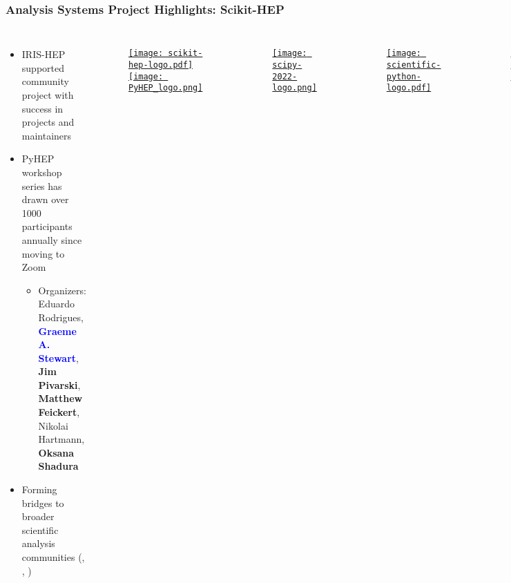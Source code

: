 \begin{frame}
  \frametitle{Analysis Systems Project Highlights: Scikit-HEP}

  \begin{columns}
    \begin{itemize}
      \item IRIS-HEP supported community project with success in projects and maintainers
      \item PyHEP workshop series has drawn over 1000 participants annually since moving to Zoom
      \begin{itemize}
        \item {\small {} Organizers: Eduardo Rodrigues, \textcolor{blue}{\textbf{Graeme A. Stewart}}, \textbf{Jim Pivarski}, \textbf{Matthew Feickert}, Nikolai Hartmann, \textbf{Oksana Shadura}}
      \end{itemize}
      \item Forming bridges to broader scientific analysis communities (, , )
    \end{itemize}
%
    \begin{figure}
        \begin{center}
            \href{https://scikit-hep.org/}{\texttt{[image: scikit-hep-logo.pdf]}}
            \href{https://indico.cern.ch/event/1150631/}{\texttt{[image: PyHEP\_logo.png]}}
        \end{center}
    \end{figure}
    \begin{figure}
        \begin{center}
            \href{https://www.scipy2022.scipy.org/}{\texttt{[image: scipy-2022-logo.png]}}
        \end{center}
    \end{figure}
    \begin{figure}
        \begin{center}
            \href{https://scientific-python.org/}{\texttt{[image: scientific-python-logo.pdf]}}
        \end{center}
    \end{figure}
    \begin{figure}
        \begin{center}
            \href{https://numfocus.org/}{\texttt{[image: NumFOCUS-logo.pdf]}}
        \end{center}
    \end{figure}
  \end{columns}
\end{frame}

